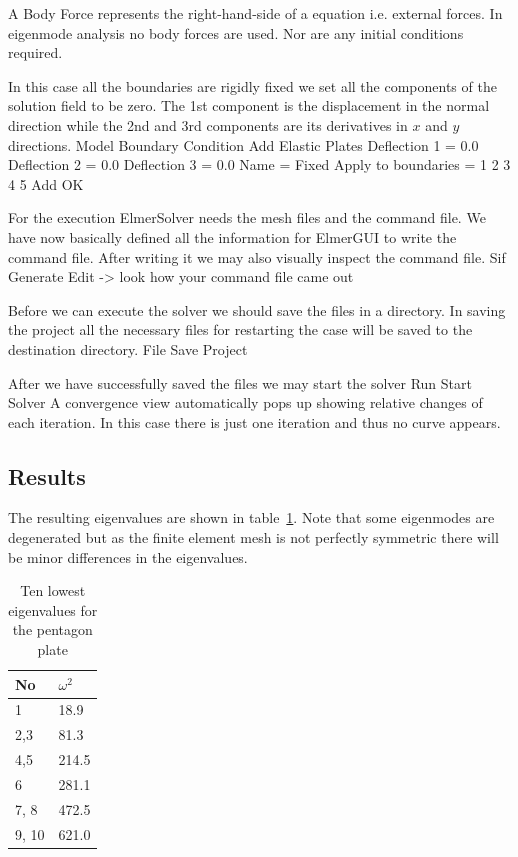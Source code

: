 A Body Force represents the right-hand-side of a equation i.e. external forces. In eigenmode analysis
no body forces are used. Nor are any initial conditions required.

In this case all the boundaries are rigidly fixed we set all the components of the 
solution field to be zero. The 1st component is the displacement in the normal direction
while the 2nd and 3rd components are its derivatives in $x$ and $y$ directions.
\ttbegin
Model
  Boundary Condition
    Add 
      Elastic Plates
        Deflection 1 = 0.0
        Deflection 2 = 0.0
        Deflection 3 = 0.0
      Name = Fixed
      Apply to boundaries = 1 2 3 4 5
      Add
      OK
\ttend   

For the execution 
ElmerSolver needs the mesh files and the command file. We have now basically defined
all the information for ElmerGUI to write the command file. After writing it we may also visually 
inspect the command file.
\ttbegin
Sif 
  Generate
  Edit -> look how your command file came out  
\ttend

Before we can execute the solver we should save the files in a directory. In saving the project all the
necessary files for restarting the case will be saved to the 
destination directory.
\ttbegin
File 
  Save Project
\ttend

After we have successfully saved the files we may start the solver
\ttbegin
Run
  Start Solver
\ttend
A convergence view automatically pops up showing relative changes of each iteration.
In this case there is just one iteration and thus no curve appears.

\subsection*{Results}
The resulting eigenvalues are shown in table~\ref{tb:pentagonres}.
Note that some eigenmodes are degenerated but as the finite element mesh is not
perfectly symmetric there will be minor differences in the eigenvalues.

\begin{table}[h]
\caption{Ten lowest eigenvalues for the pentagon plate}
\label{tb:pentagonres}
\begin{center}
\begin{tabular}{ll} \hline
No & $\omega^2$ \\ \hline
1 & 18.9 \\
2,3 & 81.3 \\
4,5 & 214.5 \\
6   & 281.1 \\
7, 8 & 472.5 \\
9, 10 & 621.0 \\ \hline
\end{tabular}
\end{center}
\end{table}

